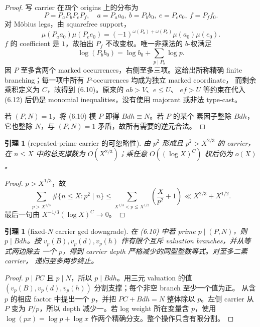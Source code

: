 \documentclass[11pt,a4paper]{ctexart}
\newtheorem{lemma}[theorem]{引理}
\theoremstyle{definition}
\newcommand{\1}{\mathbf 1}
\begin{document}
\begin{proof}
写 carrier 在四个 origins 上的分布为
\[
P=P_aP_bP_eP_f,\quad
a=P_aa_0,\ b=P_bb_0,\ e=P_ee_0,\ f=P_ff_0.           \tag{6.12}
\]
对 Möbius legs，由 squarefree support，
\[
\mu(P_aa_0)\mu(P_ee_0)
=(-1)^{\omega(P_a)+\omega(P_e)}\mu(a_0)\mu(e_0).    \tag{6.13}
\]
$f$ 的 coefficient 是 $1$，故抽出 $P_f$ 不改变权。唯一非乘法的 $b$-权满足
\[
\log(P_bb_0)=\log b_0+\sum_{p\mid P_b}\log p.       \tag{6.14}
\]
因 $P$ 至多含两个 marked occurrences，右侧至多三项。这给出所称精确
finite branching；每一项中所有 $P$-occurrences 均成为独立 marked coordinate，
而剩余乘积定义为 $C$，故得到 (6.10)。原来的 $ab>V$、$e\le U$、
$ef>U$ 等约束在代入 (6.12) 后仍是 monomial inequalities，没有使用
majorant 或非法 type-cast。

若 $(P,N)=1$，将 (6.10) 模 $P$ 即得 $Bdh\equiv N$。若 $P$ 的某个
素因子整除 $Bdh$，它也整除 $N$，与 $(P,N)=1$ 矛盾，故所有需要的逆元合法。
\end{proof}

\begin{lemma}[repeated-prime carrier 的可忽略性]\label{lem:p2carrier}
由 $p^2$ 形成且 $p^2>X^{2/3}$ 的 carrier，在 $n\le X$ 中的总支撑数为
$O(X^{2/3})$；乘任意 $O((\log X)^C)$ 权后仍为 $o(X)$。
\end{lemma}

\begin{proof}
$p>X^{1/3}$，故
\[
\sum_{p>X^{1/3}}\#\{n\le X:p^2\mid n\}
\le\sum_{X^{1/3}<p\le X^{1/2}}\left(\frac X{p^2}+1\right)
\ll X^{2/3}+X^{1/2}.                                  \tag{6.15}
\]
最后一句由 $X^{-1/3}(\log X)^C\to0$。
\end{proof}

\begin{lemma}[fixed-$N$ carrier gcd downgrade]\label{lem:gcd-down}
在 (6.10) 中若 prime $p\mid(P,N)$，则 $p\mid Bdh$。按
$v_p(B),v_p(d),v_p(h)$ 作有限个互斥 valuation branches，并从等式两边除去
一个 $p$，得到 carrier depth 严格减少的同型整数等式。对至多二素 carrier，
递归至多两步终止。
\end{lemma}

\begin{proof}
$p\mid PC$ 且 $p\mid N$，所以 $p\mid Bdh$。用三元 valuation 的值
$(v_p(B),v_p(d),v_p(h))$ 分割支撑；每个非空 branch 至少一个值为正。
从含 $p$ 的相应 factor 中提出一个 $p$，并把
$PC+Bdh=N$ 整体除以 $p$。左侧 carrier 从 $P$ 变为 $P/p$，所以 depth
减少一。若 log weight 所在变量含 $p$，使用
$\log(px)=\log p+\log x$ 作两个精确分支。整个操作只含有限分割。
\end{proof}
\end{document}
